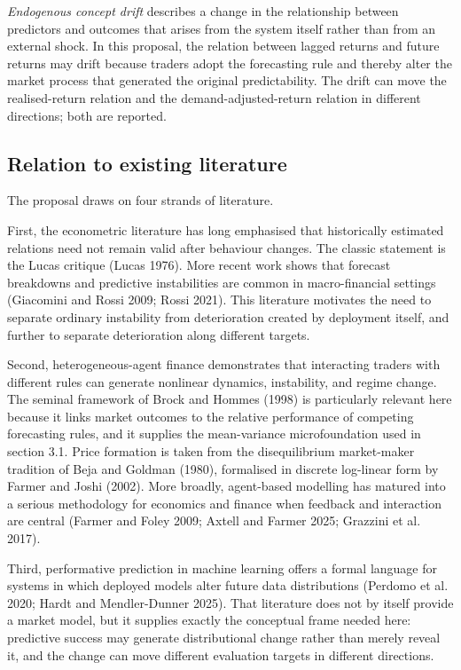 \documentclass[11pt]{article}
\begin{document}
\emph{Endogenous concept drift} describes a change in the relationship between predictors and outcomes that arises from the system itself rather than from an external shock. In this proposal, the relation between lagged returns and future returns may drift because traders adopt the forecasting rule and thereby alter the market process that generated the original predictability. The drift can move the realised-return relation and the demand-adjusted-return relation in different directions; both are reported.

\subsection{Relation to existing literature}

The proposal draws on four strands of literature.

First, the econometric literature has long emphasised that historically estimated relations need not remain valid after behaviour changes. The classic statement is the Lucas critique (Lucas 1976). More recent work shows that forecast breakdowns and predictive instabilities are common in macro-financial settings (Giacomini and Rossi 2009; Rossi 2021). This literature motivates the need to separate ordinary instability from deterioration created by deployment itself, and further to separate deterioration along different targets.

Second, heterogeneous-agent finance demonstrates that interacting traders with different rules can generate nonlinear dynamics, instability, and regime change. The seminal framework of Brock and Hommes (1998) is particularly relevant here because it links market outcomes to the relative performance of competing forecasting rules, and it supplies the mean-variance microfoundation used in section 3.1. Price formation is taken from the disequilibrium market-maker tradition of Beja and Goldman (1980), formalised in discrete log-linear form by Farmer and Joshi (2002). More broadly, agent-based modelling has matured into a serious methodology for economics and finance when feedback and interaction are central (Farmer and Foley 2009; Axtell and Farmer 2025; Grazzini et al. 2017).

Third, performative prediction in machine learning offers a formal language for systems in which deployed models alter future data distributions (Perdomo et al. 2020; Hardt and Mendler-Dunner 2025). That literature does not by itself provide a market model, but it supplies exactly the conceptual frame needed here: predictive success may generate distributional change rather than merely reveal it, and the change can move different evaluation targets in different directions.
\end{document}

